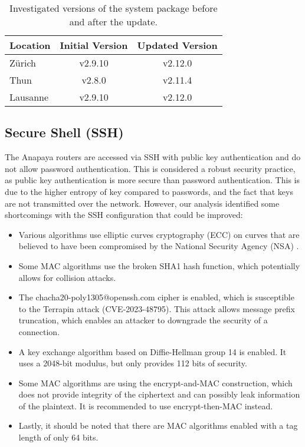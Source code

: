 \begin{table}[h]
    \centering
    \begin{tabular}{|l|c|c|}
        \hline
        \textbf{Location} & \textbf{Initial Version} & \textbf{Updated Version} \\
        \hline
        Zürich & v2.9.10 & v2.12.0 \\
        \hline
        Thun & v2.8.0 & v2.11.4\\
        \hline
        Lausanne & v2.9.10 & v2.12.0\\
        \hline
    \end{tabular}
    \caption{Investigated versions of the system package before and after the update.}
    \label{tab:system_software_versions}
\end{table}



\subsection{Secure Shell (SSH)}
\label{sec:ssh}
The Anapaya routers are accessed via SSH with public key authentication and do not allow password authentication.
This is considered a robust security practice, as public key authentication is more secure than password authentication.
This is due to the higher entropy of key compared to passwords, and the fact that keys are not transmitted over the network.
However, our analysis identified some shortcomings with the SSH configuration that could be improved:

\begin{itemize}
    \item Various algorithms use elliptic curves cryptography (ECC) on curves that are believed to have been compromised by the National Security Agency (NSA) \cite{nist1_safecurves}.
    \item Some MAC algorithms use the broken SHA1 hash function, which potentially allows for collision attacks.
    \item The chacha20-poly1305@openssh.com cipher is enabled, which is susceptible to the Terrapin attack (CVE-2023-48795).
    This attack allows message prefix truncation, which enables an attacker to downgrade the security of a connection.
    \item A key exchange algorithm based on Diffie-Hellman group 14 is enabled. It uses a 2048-bit modulus, but only provides 112 bits of security.
    \item Some MAC algorithms are using the encrypt-and-MAC construction, which does not provide integrity of the ciphertext and can possibly leak information of the plaintext.
    It is recommended to use encrypt-then-MAC instead.
    \item Lastly, it should be noted that there are MAC algorithms enabled with a tag length of only 64 bits.
\end{itemize}

